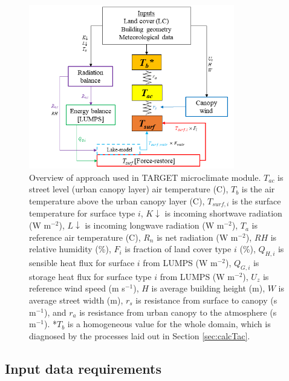 \documentclass[journal abbreviation, manuscript]{copernicus}
\begin{document}
\begin{figure}[!htbp]
\begin{center}

\includegraphics[width=0.8\textwidth,keepaspectratio]{figure1.png}

\caption{Overview of approach used in TARGET microclimate module. $T_{ac}$ is street level (urban canopy layer) air temperature (\degree C), \ensuremath{T_{b}} is the air temperature above the urban canopy layer (\degree C), $T_{surf,i}$ is the surface temperature for surface type $i$, \ensuremath{K\downarrow} is incoming shortwave radiation (W m$^{-2}$), \ensuremath{L\downarrow} is incoming longwave radiation (W m$^{-2}$), \ensuremath{T_{a}} is reference air temperature (\degree C), \ensuremath{R_{n}} is net radiation (W m$^{-2}$), \ensuremath{RH} is relative humidity (\%), $F_{i}$ is fraction of land cover type $i$ (\%), \ensuremath{Q_{H,i}} is sensible heat flux for surface $i$ from LUMPS (W m$^{-2}$), \ensuremath{Q_{G,i}} is storage heat flux for surface type $i$ from LUMPS (W m$^{-2}$), \ensuremath{U_{z}} is reference wind speed (m s$^{-1}$), $H$ is average building height (m), $W$ is average street width (m), \ensuremath{r_{s}} is resistance from surface to canopy (s m$^{-1}$), and \ensuremath{r_{a}} is resistance from urban canopy to the atmosphere (s m$^{-1}$). *\ensuremath{T_{b}} is a homogeneous value for the whole domain, which is diagnosed by the processes laid out in Section \ref{sec:calcTac}.} \label{fig:overview}
 \end{center}

\end{figure}


\subsection{Input data requirements}\label{sec:datainputs}
\end{document}
